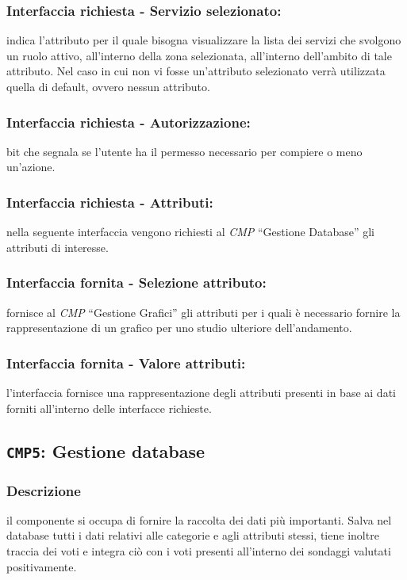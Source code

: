         \subsubsection{Interfaccia richiesta - Servizio selezionato:}
            indica l'attributo per il quale bisogna visualizzare la lista dei servizi che svolgono un ruolo attivo, all'interno della zona selezionata, all'interno dell'ambito di tale attributo. Nel caso in cui non vi fosse un'attributo selezionato verrà utilizzata quella di default, ovvero nessun attributo.
        \subsubsection{Interfaccia richiesta - Autorizzazione:}
            bit che segnala se l'utente ha il permesso necessario per compiere o meno un'azione.
        \subsubsection{Interfaccia richiesta - Attributi:}
            nella seguente interfaccia vengono richiesti al \textit{CMP} ``Gestione Database'' gli attributi di  interesse.
        \subsubsection{Interfaccia fornita - Selezione attributo:}
            fornisce al \textit{CMP} ``Gestione Grafici'' gli attributi per i quali è necessario fornire la rappresentazione di un grafico per uno studio ulteriore dell'andamento.
        \subsubsection{Interfaccia fornita - Valore attributi:}
            l'interfaccia fornisce una rappresentazione degli attributi presenti in base ai dati forniti all'interno delle interfacce richieste.

    \subsection{\texttt{CMP5}: Gestione database}
        \subsubsection{Descrizione} 
            il componente si occupa di fornire la raccolta dei dati più importanti. Salva nel database tutti i dati relativi alle categorie e agli attributi stessi, tiene inoltre traccia dei voti e integra ciò con i voti presenti all'interno dei sondaggi valutati positivamente.

